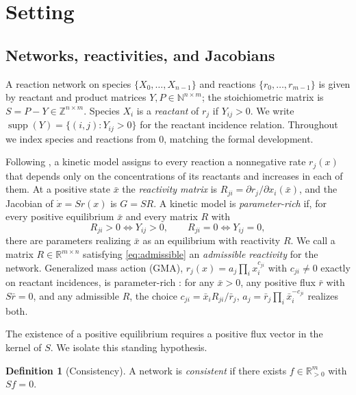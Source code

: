 \documentclass[11pt,a4paper]{article}
\theoremstyle{definition}
\newtheorem{definition}[theorem]{Definition}
\theoremstyle{remark}
\newcommand{\R}{\mathbb{R}}
\newcommand{\Z}{\mathbb{Z}}
\newcommand{\N}{\mathbb{N}}
\newcommand{\supp}{\operatorname{supp}}
\begin{document}
\section{Setting}\label{sec:setting}

\subsection{Networks, reactivities, and Jacobians}

A reaction network on species $\{X_0,\dots,X_{n-1}\}$ and reactions $\{r_0,\dots,r_{m-1}\}$ is given by reactant and product matrices $Y,P\in\N^{n\times m}$; the stoichiometric matrix is $S=P-Y\in\Z^{n\times m}$. Species $X_i$ is a \emph{reactant} of $r_j$ if $Y_{ij}>0$. We write $\supp(Y)=\{(i,j):Y_{ij}>0\}$ for the reactant incidence relation. Throughout we index species and reactions from $0$, matching the formal development.

Following \cite[Def.~1, Def.~3]{VassenaStadler2024}, a kinetic model assigns to every reaction a nonnegative rate $r_j(x)$ that depends only on the concentrations of its reactants and increases in each of them. At a positive state $\bar x$ the \emph{reactivity matrix} is $R_{ji}=\partial r_j/\partial x_i(\bar x)$, and the Jacobian of $\dot x = S r(x)$ is $G=SR$. A kinetic model is \emph{parameter-rich} if, for every positive equilibrium $\bar x$ and every matrix $R$ with
\begin{equation}\label{eq:admissible}
R_{ji}>0 \iff Y_{ij}>0,\qquad R_{ji}=0 \iff Y_{ij}=0,
\end{equation}
there are parameters realizing $\bar x$ as an equilibrium with reactivity $R$. We call a matrix $R\in\R^{m\times n}$ satisfying \eqref{eq:admissible} an \emph{admissible reactivity} for the network. Generalized mass action (GMA), $r_j(x)=a_j\prod_i x_i^{c_{ji}}$ with $c_{ji}\ne0$ exactly on reactant incidences, is parameter-rich \cite[Lemma~6]{VassenaStadler2024}: for any $\bar x>0$, any positive flux $\bar r$ with $S\bar r=0$, and any admissible $R$, the choice $c_{ji}=\bar x_i R_{ji}/\bar r_j$, $a_j=\bar r_j\prod_i \bar x_i^{-c_{ji}}$ realizes both.

The existence of a positive equilibrium requires a positive flux vector in the kernel of $S$. We isolate this standing hypothesis.

\begin{definition}[Consistency]\label{def:consistent}
A network is \emph{consistent} if there exists $f\in\R^m_{>0}$ with $Sf=0$.
\end{definition}
\end{document}
